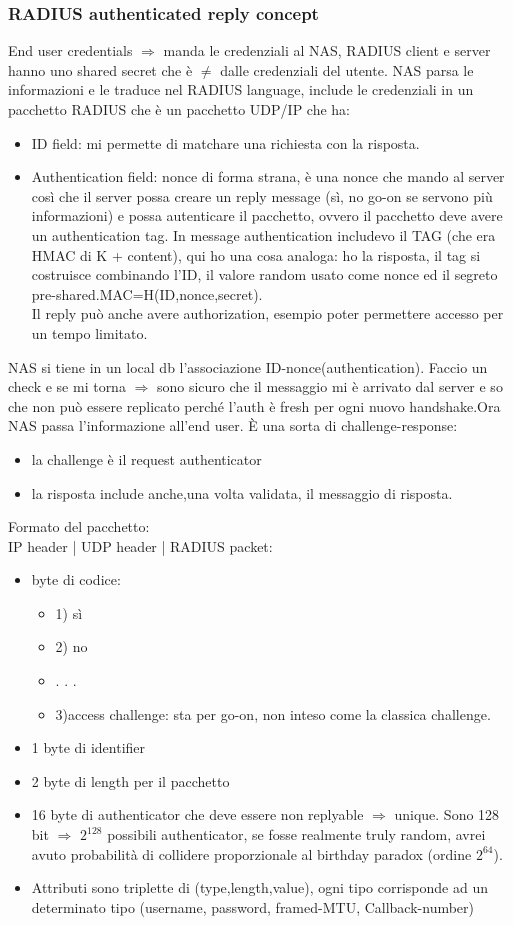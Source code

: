 \documentclass[16px]{article}
\begin{document}
\subsubsection{RADIUS authenticated reply concept}
End user credentials $\Longrightarrow$ manda le credenziali al NAS, RADIUS client e server hanno uno shared secret che è $\neq$ dalle credenziali del utente. NAS parsa le informazioni e le traduce nel RADIUS language, include le credenziali in un pacchetto RADIUS che è un pacchetto UDP/IP che ha:
\begin{itemize}
\item ID field: mi permette di matchare una richiesta con la risposta.
\item Authentication field: nonce di forma strana, è una nonce che mando al server così che il server possa creare un reply message (sì, no go-on se servono più informazioni) e possa autenticare il pacchetto, ovvero il pacchetto deve avere un authentication tag. In message authentication includevo il TAG (che era HMAC di K + content), qui ho una cosa analoga: ho la risposta, il tag si costruisce combinando l'ID, il valore random usato come nonce ed il segreto pre-shared.MAC=H(ID,nonce,secret).\\ Il reply può anche avere authorization, esempio poter permettere accesso per un tempo limitato.
\end{itemize}
NAS si tiene in un local db l'associazione ID-nonce(authentication). Faccio un check e se mi torna $\Rightarrow$ sono sicuro che il messaggio mi è arrivato dal server e so che non può essere replicato perché l'auth è fresh per ogni nuovo handshake.Ora NAS passa l'informazione all'end user. È una sorta di challenge-response:
\begin{itemize}
\item la challenge è il request authenticator
\item la risposta include anche,una volta validata, il messaggio di risposta.
\end{itemize}
Formato del pacchetto:\\
IP header | UDP header | RADIUS packet: 
\begin{itemize} 
\item byte di codice:
\begin{itemize}
\item 1) sì
\item 2) no
\item . . .
\item 3)access challenge: sta per go-on, non inteso come la classica challenge.
\end{itemize}
\item 1 byte di identifier
\item 2 byte di length per il pacchetto
\item 16 byte di authenticator che deve essere non replyable $\Rightarrow$ unique. Sono 128 bit $\Rightarrow$ $2^128$ possibili authenticator, se fosse realmente truly random, avrei avuto probabilità di collidere proporzionale al birthday paradox (ordine $2^64$). 
\item Attributi sono triplette di (type,length,value), ogni tipo corrisponde ad un determinato tipo (username, password, framed-MTU, Callback-number)
\end{itemize}
\end{document}

